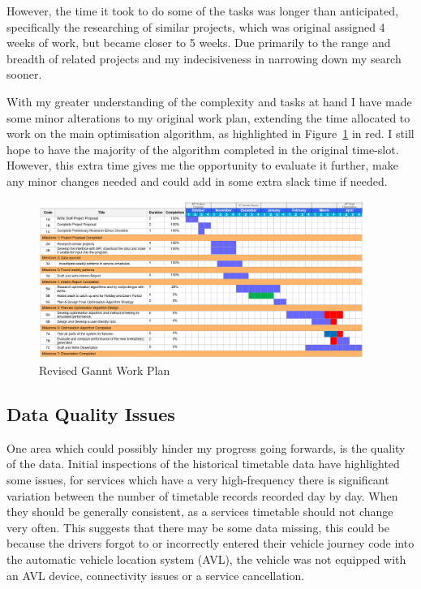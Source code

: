 \documentclass{article}
\begin{document}
\par 
However, the time it took to do some of the tasks was longer than anticipated, specifically the researching of similar projects, which was original assigned 4 weeks of work, but became closer to 5 weeks. Due primarily to the range and breadth of related projects and my indecisiveness in narrowing down my search sooner. 


\par 
With my greater understanding of the complexity and tasks at hand I have made some minor alterations to my original work plan, extending the time allocated to work on the main optimisation algorithm, as highlighted in Figure~\ref{fig:ganntchart} in red. I still hope to have the majority of the algorithm completed in the original time-slot. However, this extra time gives me the opportunity to evaluate it further, make any minor changes needed and could add in some extra slack time if needed.

\begin{figure}[H]
	\centering
	\includegraphics[width=400px]{images/ganntChartV3.png}
	\caption{Revised Gannt Work Plan}
	\label{fig:ganntchart}
\end{figure}



\subsection{Data Quality Issues} 
One area which could possibly hinder my progress going forwards, is the quality of the data. Initial inspections of the historical timetable data have highlighted some issues, for services which have a very high-frequency there is significant variation between the number of timetable records recorded day by day. When they should be generally consistent, as a services timetable should not change very often. This suggests that there may be some data missing, this could be because the drivers forgot to or incorrectly entered their vehicle journey code into the automatic vehicle location system (AVL), the vehicle was not equipped with an AVL device, connectivity issues or a service cancellation. 
\end{document}
